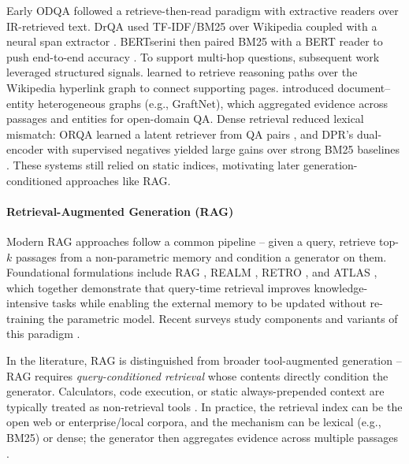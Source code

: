 Early ODQA followed a retrieve-then-read paradigm with extractive readers over IR-retrieved text. DrQA used TF-IDF/BM25 over Wikipedia coupled with a neural span extractor \cite{chenReadingWikipediaAnswer2017a}. BERTserini then paired BM25 with a BERT reader to push end-to-end accuracy \cite{yangEndtoEndOpenDomainQuestion2019a}. To support multi-hop questions, subsequent work leveraged structured signals. \citet{asaiLearningRetrieveReasoning2020a} learned to retrieve reasoning paths over the Wikipedia hyperlink graph to connect supporting pages. \citet{sunOpenDomainQuestion2018} introduced document–entity heterogeneous graphs (e.g., GraftNet), which aggregated evidence across passages and entities for open-domain QA. Dense retrieval reduced lexical mismatch: ORQA learned a latent retriever from QA pairs \cite{leeLatentRetrievalWeakly2019}, and DPR’s dual-encoder with supervised negatives yielded large gains over strong BM25 baselines \cite{karpukhinDensePassageRetrieval2020b}. These systems still relied on static indices, motivating later generation-conditioned approaches like RAG.

\paragraph{\textbf{Retrieval-Augmented Generation (RAG)}}

Modern RAG approaches follow a common pipeline -- given a query, retrieve top-$k$ passages from a non-parametric memory and condition a generator on them. Foundational formulations include RAG \cite{lewisRetrievalAugmentedGenerationKnowledgeIntensive2020a}, REALM \cite{guuRetrievalAugmentedLanguage2020}, RETRO \cite{borgeaudImprovingLanguageModels2022}, and ATLAS \cite{izacardAtlasFewshotLearning2022}, which together demonstrate that query-time retrieval improves knowledge-intensive tasks while enabling the external memory to be updated without re-training the parametric model. Recent surveys study components and variants of this paradigm \cite{gaoRetrievalAugmentedGenerationLarge2024}.

In the literature, RAG is distinguished from broader tool-augmented generation -- RAG requires \emph{query-conditioned retrieval} whose contents directly condition the generator. Calculators, code execution, or static always-prepended context are typically treated as non-retrieval tools \cite{mialonAugmentedLanguageModels2023}. In practice, the retrieval index can be the open web or enterprise/local corpora, and the mechanism can be lexical (e.g., BM25) or dense; the generator then aggregates evidence across multiple passages \cite{izacardLeveragingPassageRetrieval2021,lewisRetrievalAugmentedGenerationKnowledgeIntensive2020a}.


